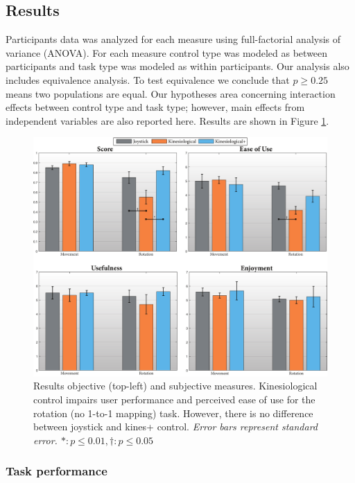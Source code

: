 \documentclass{sigchi}
\begin{document}
\subsection{Results}

Participants data was analyzed for each measure using full-factorial analysis of variance (ANOVA). For each measure control type was modeled as between participants and task type was modeled as within participants. Our analysis also includes equivalence analysis. To test equivalence we conclude that $p\geq0.25$ means two populations are equal. Our hypotheses area concerning interaction effects between control type and task type; however, main effects from independent variables are also reported here. Results are shown in Figure \ref{fig:bar_chart}.

\begin{figure}[t]
	\centering
	\includegraphics[width=\columnwidth]{figures/bar_charts.pdf}
	\caption{Results objective (top-left) and subjective measures. Kinesiological control impairs user performance and perceived ease of use for the rotation (no 1-to-1 mapping) task. However, there is no difference between joystick and kines+ control. \em{Error bars represent standard error.} $\ast: p \leq 0.01, \dagger:p \leq 0.05 $ }
	\label{fig:bar_chart}
\end{figure} 

\subsubsection{Task performance}
\end{document}

